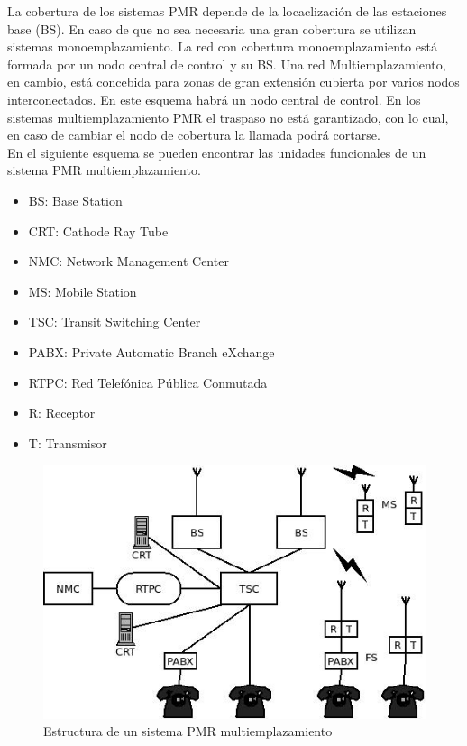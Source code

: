 La cobertura de los sistemas \acrshort{PMR} depende de la locaclización de las estaciones base (\acrshort{BS}). En caso de que no sea necesaria una gran cobertura se utilizan sistemas monoemplazamiento. La red con cobertura monoemplazamiento está formada por un nodo central de control y su \acrshort{BS}. Una red Multiemplazamiento, en cambio, está concebida para zonas de gran extensión cubierta por varios nodos interconectados. En este esquema habrá un nodo central de control. En los sistemas multiemplazamiento \acrshort{PMR}  el traspaso no está garantizado, con lo cual, en caso de cambiar el nodo de cobertura la llamada podrá cortarse.\\
	En el siguiente esquema se pueden encontrar las unidades funcionales de un sistema \acrshort{PMR} multiemplazamiento.
\begin{itemize}
	\item 	\acrshort{BS}: Base Station
	\item 	\acrshort{CRT}: Cathode Ray Tube
	\item 	\acrshort{NMC}: Network Management Center
	\item 	\acrshort{MS}: Mobile Station
	\item 	\acrshort{TSC}: Transit Switching Center
	\item 	\acrshort{PABX}: Private Automatic Branch eXchange
	\item 	\acrshort{RTPC}: Red Telefónica Pública Conmutada
	\item 	R: Receptor
	\item 	T: Transmisor
\end{itemize}
\begin{figure}[htp]
\centering
\includegraphics[width=\textwidth]{Imagen/diaPMR.jpg}
\caption{Estructura de un sistema \acrshort{PMR}  multiemplazamiento}
\label{img:diaPMR}
\end{figure}
